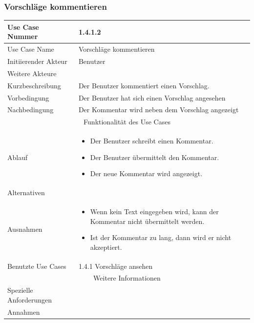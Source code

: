 \documentclass[10pt,a4paper]{article}
\begin{document}
	\subsubsection{Vorschl\"age kommentieren}
	\begin{tabular}{|l|p{.5\linewidth}|}
		\hline Use Case Nummer & 1.4.1.2 \\ 
		\hline Use Case Name & Vorschl\"age kommentieren \\ 
		\hline Initiierender Akteur & Benutzer \\
		\hline Weitere Akteure & \\
		\hline Kurzbeschreibung & Der Benutzer kommentiert einen Vorschlag. \\
		\hline Vorbedingung & Der Benutzer hat sich einen Vorschlag angesehen \\
		\hline Nachbedingung & Der Kommentar wird neben dem Vorschlag angezeigt \\
		\hline \multicolumn{2}{|c|}{Funktionalität des Use Cases}\\
		\hline Ablauf & \begin{itemize}
			\item Der Benutzer schreibt einen Kommentar.
			\item Der Benutzer \"ubermittelt den Kommentar.
			\item Der neue Kommentar wird angezeigt.
		\end{itemize} \\ 
		\hline Alternativen &  \\
		\hline Ausnahmen & \begin{itemize}
			\item Wenn kein Text eingegeben wird, kann der Kommentar nicht \"ubermittelt werden.
			\item Ist der Kommentar zu lang, dann wird er nicht akzeptiert.
		\end{itemize} \\
		\hline Benutzte Use Cases & 1.4.1 Vorschl\"age ansehen\\
		\hline \multicolumn{2}{|c|}{Weitere Informationen} \\
		\hline Spezielle Anforderungen &  \\
		\hline Annahmen &  \\
		\hline
	\end{tabular}
	
\end{document}
